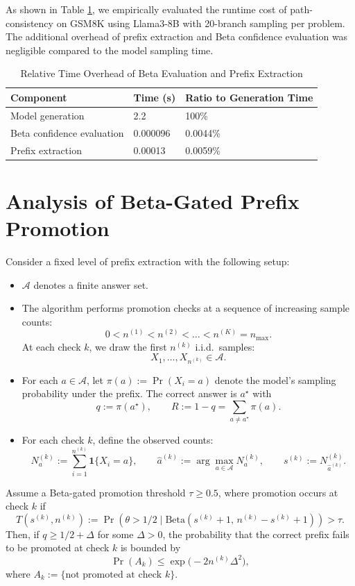 As shown in Table \ref{tab:overhead}, we empirically evaluated the runtime cost of path-consistency on GSM8K using Llama3-8B with 20-branch sampling per problem. The additional overhead of prefix extraction and Beta confidence evaluation was negligible compared to the model sampling time. 
\begin{table}[h]
\centering
\caption{Relative Time Overhead of Beta Evaluation and Prefix Extraction}
\label{tab:overhead}
\begin{tabular}{@{}lll@{}}
\toprule
Component        & Time (s) & Ratio to Generation Time \\ \midrule
Model generation           & 2.2               & 100\%                             \\
Beta confidence evaluation & 0.000096          & 0.0044\%                          \\
Prefix extraction          & 0.00013           & 0.0059\%                          \\ \bottomrule
\end{tabular}
\end{table}

\section{Analysis of Beta-Gated Prefix Promotion}
\label{app:promotion-soundness}
\begin{Theorem}
\label{thm:single-level}
Consider a fixed level of prefix extraction with the following setup:
\begin{itemize}
    \item $\mathcal A$ denotes a finite answer set.
    \item The algorithm performs promotion checks at a sequence of increasing sample counts:
    \[
    0 < n^{(1)} < n^{(2)} < \dots < n^{(K)} = n_{\max}.
    \]
    At each check $k$, we draw the first $n^{(k)}$ i.i.d.\ samples:
    \[
    X_1, \dots, X_{n^{(k)}} \in \mathcal A.
    \]
    \item For each $a\in\mathcal A$, let $\pi(a) := \Pr(X_i = a)$ denote the model's sampling probability under the prefix. The correct answer is $a^\star$ with
    \[
    q := \pi(a^\star), \qquad R := 1-q = \sum_{a \neq a^\star} \pi(a).
    \]
    \item For each check $k$, define the observed counts:
    \[
    N_a^{(k)} := \sum_{i=1}^{n^{(k)}} \mathbf{1}\{X_i = a\},
    \qquad
    \hat a^{(k)} := \arg\max_{a\in \mathcal A} N_a^{(k)},
    \qquad
    s^{(k)} := N_{\hat a^{(k)}}^{(k)}.
    \]
\end{itemize}

Assume a Beta-gated promotion threshold $\tau \ge 0.5$, where promotion occurs at check $k$ if
\[
T(s^{(k)},n^{(k)}) := \Pr(\theta > 1/2 \mid \text{Beta}(s^{(k)}+1,\,n^{(k)}-s^{(k)}+1)) > \tau.
\]
Then, if $q \ge 1/2 + \Delta$ for some $\Delta>0$, the probability that the correct prefix fails to be promoted at check $k$ is bounded by
\[
\Pr(A_k) \le \exp\big(-2 n^{(k)} \Delta^2\big),
\]
where $A_k := \{\text{not promoted at check } k\}$.
\end{Theorem}

